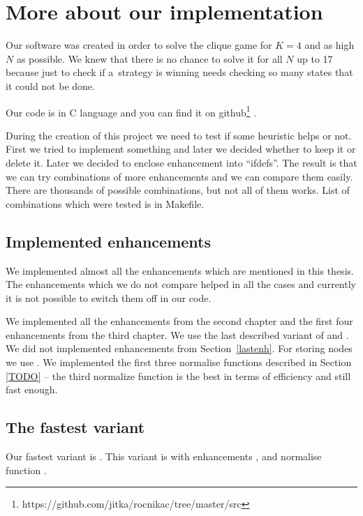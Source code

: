 \section{More about our implementation}

Our software was created in order to solve the clique game for $K=4$ and as high
$N$ as possible. We knew that there is no chance to solve it for all $N$ up
to 17 because just to check if a~strategy is winning needs checking so many
states that it could not be done. 
 
Our code is in C language and you can find it on
github\footnote{https://github.com/jitka/rocnikac/tree/master/src}
.

During the creation of this project we need to test if some heuristic helps or
not.  First we tried to implement something and later we decided whether to
keep it or delete it. Later we decided to enclose enhancement into ``ifdefs''.
The result is that we can try combinations of more enhancements and we can
compare them easily.  There are thousands of possible combinations, but not all
of them works. List of combinations which were tested is in Makefile. 

\subsection{Implemented enhancements}

We implemented almost all the enhancements which are mentioned in this thesis. 
The enhancements which we do not compare helped in all the cases and currently it is
not possible to switch them off in our code.

We implemented all the enhancements from the second chapter and the first four
enhancements from the third chapter. We use the last described variant of
 and . We did not implemented
enhancements  from
Section~\ref{lastenh}. For storing nodes we use .
We implemented the first three normalise functions described in Section \ref{TODO} --
the third normalize function  is the best
in terms of efficiency and still fast enough.

\subsection{The fastest variant}

Our fastest variant is . This  variant is 
with enhancements ,  and normalise function
.

